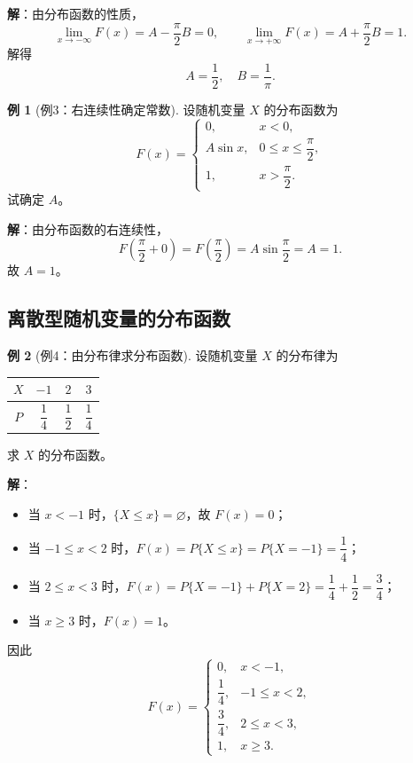 \documentclass[11pt,a4paper]{report}
\theoremstyle{definition}
\newtheorem{example}{例}[chapter]
\begin{document}
\textbf{解}：由分布函数的性质，
\[
\lim_{x\to-\infty}F(x) = A - \frac{\pi}{2}B = 0, \qquad \lim_{x\to+\infty}F(x) = A + \frac{\pi}{2}B = 1.
\]
解得
\[
\boxed{A = \frac{1}{2}, \quad B = \frac{1}{\pi}}.
\]

\begin{example}[例3：右连续性确定常数]
设随机变量 $X$ 的分布函数为
\[
F(x) = \begin{cases}
0, & x < 0, \\[0.3em]
A\sin x, & 0 \leq x \leq \dfrac{\pi}{2}, \\[0.5em]
1, & x > \dfrac{\pi}{2}.
\end{cases}
\]
试确定 $A$。
\end{example}

\textbf{解}：由分布函数的右连续性，
\[
F\left(\frac{\pi}{2}+0\right) = F\left(\frac{\pi}{2}\right) = A\sin\frac{\pi}{2} = A = 1.
\]
故 $\boxed{A=1}$。

\subsection{离散型随机变量的分布函数}

\begin{example}[例4：由分布律求分布函数]
设随机变量 $X$ 的分布律为
\begin{table}[htbp]
\centering
\begin{tabular}{@{}cccc@{}}
\toprule
$X$ & $-1$ & $2$ & $3$ \\
\midrule
$P$ & $\dfrac{1}{4}$ & $\dfrac{1}{2}$ & $\dfrac{1}{4}$ \\
\bottomrule
\end{tabular}
\end{table}
求 $X$ 的分布函数。
\end{example}

\textbf{解}：
\begin{itemize}[leftmargin=2em]
    \item 当 $x < -1$ 时，$\{X \leq x\} = \varnothing$，故 $F(x)=0$；
    \item 当 $-1 \leq x < 2$ 时，$F(x)=P\{X \leq x\}=P\{X=-1\}=\dfrac{1}{4}$；
    \item 当 $2 \leq x < 3$ 时，$F(x)=P\{X=-1\}+P\{X=2\}=\dfrac{1}{4}+\dfrac{1}{2}=\dfrac{3}{4}$；
    \item 当 $x \geq 3$ 时，$F(x)=1$。
\end{itemize}

因此
\[
F(x) = \begin{cases}
0, & x < -1, \\[0.3em]
\dfrac{1}{4}, & -1 \leq x < 2, \\[0.5em]
\dfrac{3}{4}, & 2 \leq x < 3, \\[0.5em]
1, & x \geq 3.
\end{cases}
\]
\end{document}
